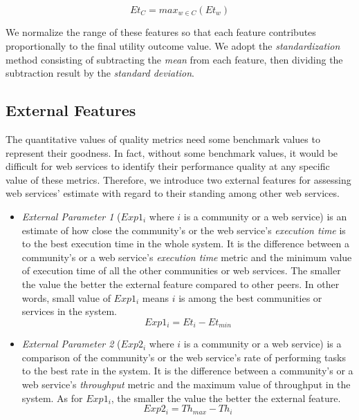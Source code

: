 \begin{itemize}
	\begin{equation}
		Et_{C} = max_{w \in C}{(Et_{w})}
	\end{equation}
	
\end{itemize}


	We normalize the range of these features so that each feature contributes proportionally to the final utility outcome value. We adopt the \emph{standardization} method consisting of subtracting the \emph{mean} from each feature, then dividing the subtraction result by the \emph{standard deviation}.


\subsection{External Features}\label{s:ef}

The quantitative values of quality metrics need some benchmark values to represent their goodness. In fact, without some benchmark values, it would be difficult for web services to identify their performance quality at any specific value of these metrics. Therefore, we introduce two external features for assessing web services' estimate with regard to their standing among other web services.

\begin{itemize}
  \item \emph{External Parameter 1} ($Exp1_i$ where $i$ is a community or a web service) is an estimate of how close the community's or the web service's \emph{execution time} is to the best execution time in the whole system. It is the difference between a community's or a web service's \emph{execution time} metric and the minimum value of execution time of all the other communities or web services. The smaller the value the better the external feature compared to other peers. In other words, small value of $Exp1_i$ means $i$ is among the best communities or services in the system.
	\begin{equation}\label{exp_1:f}
		Exp1_i = Et_{i} - Et_{min}
	\end{equation}
	\item \emph{External Parameter 2} ($Exp2_i$ where $i$ is a community or a web service)  is a comparison of the community's or the web service's rate of performing tasks to the best rate in the system. It is the difference between a community's or a web service's \emph{throughput} metric and the maximum value of throughput in the system. As for $Exp1_i$, the smaller the value the better the external feature.
	\begin{equation}\label{exp_2Lf}
		Exp2_i = Th_{max} - Th_{i}
	\end{equation}
\end{itemize}

